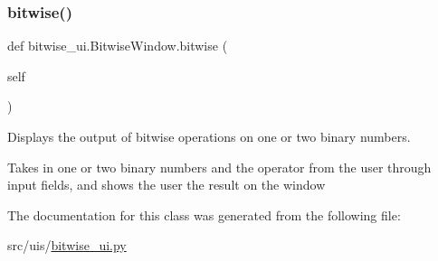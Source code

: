 \subsubsection{\texorpdfstring{bitwise()}{bitwise()}}
{\footnotesize\ttfamily def bitwise\+\_\+ui.\+Bitwise\+Window.\+bitwise (\begin{DoxyParamCaption}\item[{}]{self }\end{DoxyParamCaption})}



Displays the output of bitwise operations on one or two binary numbers. 

Takes in one or two binary numbers and the operator from the user through input fields, and shows the user the result on the window 

The documentation for this class was generated from the following file\+:\begin{DoxyCompactItemize}
\item 
src/uis/\hyperlink{bitwise__ui_8py}{bitwise\+\_\+ui.\+py}\end{DoxyCompactItemize}

